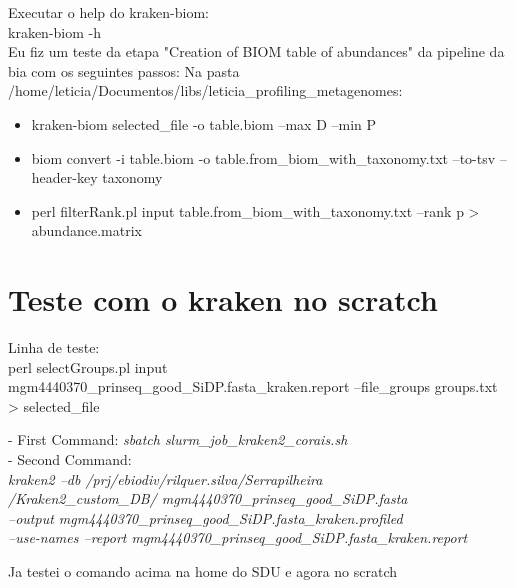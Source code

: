 \documentclass[12pt, a4paper]{report}
\begin{document}
Executar o help do kraken-biom: \\
kraken-biom -h \\

 
Eu fiz um teste da etapa "Creation of BIOM table of abundances" da pipeline da bia com os seguintes passos:
Na pasta\: 
 /home/leticia/Documentos/libs/leticia\_profiling\_metagenomes: 

\begin{itemize}
\item kraken-biom selected\_file -o table.biom --max D --min P 
\item biom convert -i table.biom -o table.from\_biom\_with\_taxonomy.txt --to-tsv --header-key taxonomy 
\item perl filterRank.pl \-\-input table.from\_biom\_with\_taxonomy.txt --rank p > abundance.matrix 
\end{itemize}

\section{Teste com o kraken no scratch}
Linha de teste: \\
perl selectGroups.pl \-\-input mgm4440370\_prinseq\_good\_SiDP.fasta\_kraken.report --file\_groups groups.txt > selected\_file



\begin{tcolorbox}[width=6.3in]
- First Command: \textit{sbatch slurm\_job\_kraken2\_corais.sh}\\
- Second Command: \textit{\\
kraken2 --db /prj/ebiodiv/rilquer.silva/Serrapilheira \\
/Kraken2\_custom\_DB/ mgm4440370\_prinseq\_good\_SiDP.fasta \\
--output mgm4440370\_prinseq\_good\_SiDP.fasta\_kraken.profiled \\
--use-names --report mgm4440370\_prinseq\_good\_SiDP.fasta\_kraken.report}
\end{tcolorbox}

Ja testei o comando acima na home do SDU e agora no scratch
\end{document}
